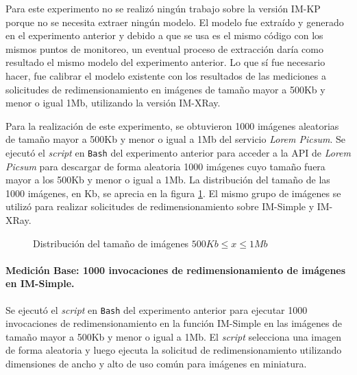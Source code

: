 Para este experimento no se realizó ningún trabajo sobre la versión IM-KP porque no se necesita extraer ningún modelo. El modelo fue extraído y generado en el experimento anterior y debido a que se usa es el mismo código con los mismos puntos de monitoreo, un eventual proceso de extracción daría como resultado el mismo modelo del experimento anterior. Lo que sí fue necesario hacer, fue calibrar el modelo existente con los resultados de las mediciones a solicitudes de redimensionamiento en imágenes de tamaño mayor a 500Kb y menor o igual 1Mb, utilizando la versión IM-XRay. 

Para la realización de este experimento, se obtuvieron 1000 imágenes aleatorias de tamaño mayor a 500Kb y menor o igual a 1Mb del servicio \emph{Lorem Picsum}. Se ejecutó el \emph{script} en \texttt{Bash} del experimento anterior para acceder a la API de \emph{Lorem Picsum} para descargar de forma aleatoria 1000 imágenes cuyo tamaño fuera mayor a los 500Kb y menor o igual a 1Mb. La distribución del tamaño de las 1000 imágenes, en Kb, se aprecia en la figura \ref{fig:distribucion-tamanno-imagenes-hasta-1mb}. El mismo grupo de imágenes se utilizó para realizar solicitudes de redimensionamiento sobre IM-Simple y IM-XRay.

\begin{figure}
\hspace{-1.0cm}
\caption{Distribución del tamaño de imágenes $500Kb \leq x \leq 1Mb$}
\label{fig:distribucion-tamanno-imagenes-hasta-1mb}
\end{figure}

\paragraph{Medición Base: 1000 invocaciones de redimensionamiento de imágenes en IM-Simple.} 
Se ejecutó el \emph{script} en \texttt{Bash} del experimento anterior para ejecutar 1000 invocaciones de redimensionamiento en la función IM-Simple en las imágenes de tamaño mayor a 500Kb y menor o igual a 1Mb. El \emph{script} selecciona una imagen de forma aleatoria y luego ejecuta la solicitud de redimensionamiento utilizando dimensiones de ancho y alto de uso común para imágenes en miniatura.

